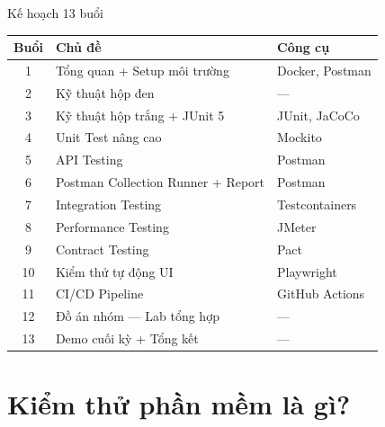 \documentclass[aspectratio=169,12pt]{beamer}
\begin{document}
\begin{frame}[shrink=10]{Kế hoạch 13 buổi}
  \begin{center}
  \small
  \begin{tabular}{cll}
    \toprule
    \textbf{Buổi} & \textbf{Chủ đề} & \textbf{Công cụ} \\
    \midrule
    1  & Tổng quan + Setup môi trường        & Docker, Postman \\
    2  & Kỹ thuật hộp đen                    & --- \\
    3  & Kỹ thuật hộp trắng + JUnit 5        & JUnit, JaCoCo \\
    4  & Unit Test nâng cao                  & Mockito \\
    5  & API Testing                         & Postman \\
    6  & Postman Collection Runner + Report  & Postman \\
    7  & Integration Testing                 & Testcontainers \\
    8  & Performance Testing                 & JMeter \\
    9  & Contract Testing                    & Pact \\
    10 & Kiểm thử tự động UI                 & Playwright \\
    11 & CI/CD Pipeline                      & GitHub Actions \\
    12 & Đồ án nhóm --- Lab tổng hợp         & --- \\
    13 & Demo cuối kỳ + Tổng kết             & --- \\
    \bottomrule
  \end{tabular}
  \end{center}
\end{frame}

\section{Kiểm thử phần mềm là gì?}
\end{document}
